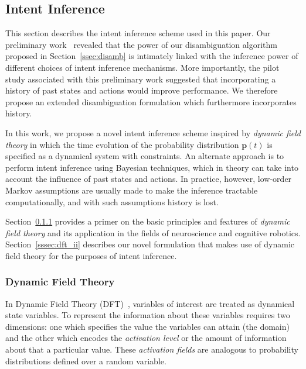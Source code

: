 \documentclass[natbib, twocolumn]{svjour3}          %
\begin{document}
\subsection{Intent Inference}\label{ssec:inference}
This section describes the intent inference scheme used in this paper. Our preliminary work~\citep{gopinath2017mode} revealed that the power of our disambiguation algorithm proposed in Section~\ref{ssec:disamb} is intimately linked with the inference power of different choices of intent inference mechanisms. More importantly, the pilot study associated with this preliminary work suggested that incorporating a history of past states and actions would improve performance. We therefore propose an extended disambiguation formulation which furthermore incorporates history.


In this work, we propose a novel intent inference scheme inspired by \textit{dynamic field theory} in which the time evolution of the probability distribution $\boldsymbol{p}(t)$ is specified as a dynamical system with constraints. An alternate approach is to perform intent inference using Bayesian techniques, which in theory can take into account the influence of past states and actions. In practice, however, low-order Markov assumptions are usually made to make the inference tractable computationally, and with such assumptions history is lost.

 Section~\ref{sssec:dft} provides a primer on the basic principles and features of \textit{dynamic field theory} and its application in the fields of neuroscience and cognitive robotics. Section~\ref{sssec:dft_ii} describes our novel formulation that makes use of dynamic field theory for the purposes of intent inference. 

\subsubsection{Dynamic Field Theory}\label{sssec:dft}

In Dynamic Field Theory (DFT)~\citep{schoner2015dynamic}, variables of interest are treated as dynamical state variables. To represent the information about these variables requires two dimensions: one which specifies the value the variables can attain (the domain) and the other which encodes the \textit{activation level} or the amount of information about that a particular value. These \textit{activation fields} are analogous to probability distributions defined over a random variable. 
\end{document}
